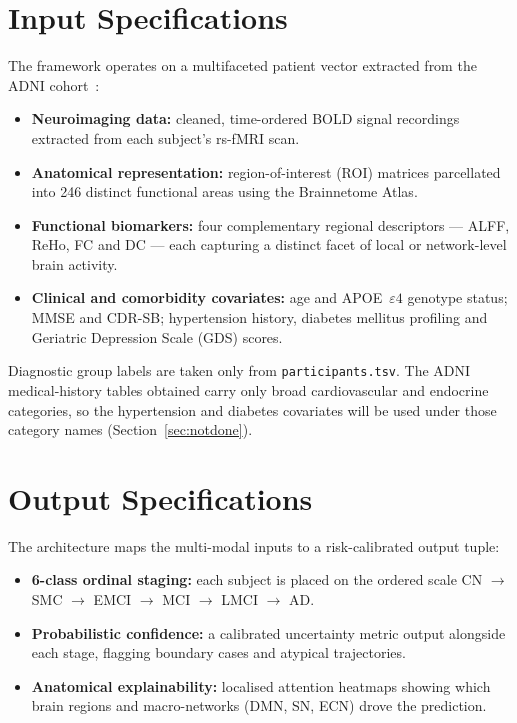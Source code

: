 \documentclass{ssnreview}
\begin{document}
\section{Input Specifications}
The framework operates on a multifaceted patient vector extracted from the ADNI
cohort~\cite{adnimri,adniclinical}:
\begin{itemize}[leftmargin=2em]
  \item \textbf{Neuroimaging data:} cleaned, time-ordered BOLD signal recordings
        extracted from each subject's rs-fMRI scan.
  \item \textbf{Anatomical representation:} region-of-interest (ROI) matrices
        parcellated into 246 distinct functional areas using the Brainnetome Atlas.
  \item \textbf{Functional biomarkers:} four complementary regional descriptors
        --- ALFF, ReHo, FC and DC --- each capturing a distinct facet of local or
        network-level brain activity.
  \item \textbf{Clinical and comorbidity covariates:} age and APOE~$\varepsilon4$
        genotype status; MMSE and CDR-SB; hypertension history, diabetes mellitus
        profiling and Geriatric Depression Scale (GDS) scores.
\end{itemize}
Diagnostic group labels are taken only from \texttt{participants.tsv}. The ADNI medical-history tables obtained carry only broad cardiovascular and endocrine categories, so the hypertension and diabetes covariates will be used under those category names (Section~\ref{sec:notdone}).

\section{Output Specifications}
The architecture maps the multi-modal inputs to a risk-calibrated output tuple:
\begin{itemize}[leftmargin=2em]
  \item \textbf{6-class ordinal staging:} each subject is placed on the ordered scale
        CN $\rightarrow$ SMC $\rightarrow$ EMCI $\rightarrow$ MCI $\rightarrow$ LMCI
        $\rightarrow$ AD.
  \item \textbf{Probabilistic confidence:} a calibrated uncertainty metric output
        alongside each stage, flagging boundary cases and atypical trajectories.
  \item \textbf{Anatomical explainability:} localised attention heatmaps showing which
        brain regions and macro-networks (DMN, SN, ECN) drove the prediction.
\end{itemize}
\end{document}
